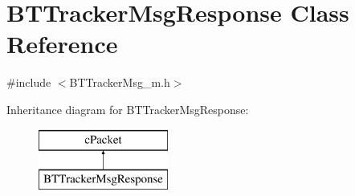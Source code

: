 \hypertarget{classBTTrackerMsgResponse}{}\section{B\+T\+Tracker\+Msg\+Response Class Reference}
\label{classBTTrackerMsgResponse}


{\ttfamily \#include $<$B\+T\+Tracker\+Msg\+\_\+m.\+h$>$}

Inheritance diagram for B\+T\+Tracker\+Msg\+Response\+:\begin{figure}[H]
\begin{center}
\leavevmode
\includegraphics[height=2.000000cm]{classBTTrackerMsgResponse}
\end{center}
\end{figure}
